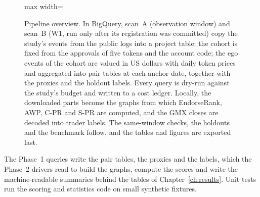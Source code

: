 \begin{figure}[htbp]
\begin{adjustbox}{max width=\linewidth}
\end{adjustbox}
\caption[{Pipeline overview: the study's events are copied and aggregated in BigQuery, the cohort is fixed, the pair tables are downloaded, and the scores, checks, holdouts and benchmark are computed locally.}]{Pipeline overview. In BigQuery, scan~A (observation window) and scan~B (W1, run only after its registration was committed) copy the study's events from the public logs into a project table; the cohort is fixed from the approvals of five tokens and the account code; the ego events of the cohort are valued in US dollars with daily token prices and aggregated into pair tables at each anchor date, together with the proxies and the holdout labels. Every query is dry-run against the study's budget and written to a cost ledger. Locally, the downloaded parts become the graphs from which EndorseRank, AWP, C-PR and S-PR are computed, and the GMX closes are decoded into trader labels. The same-window checks, the holdouts and the benchmark follow, and the tables and figures are exported last.}
\label{fig:pipeline-architecture}
\end{figure}

The Phase~1 queries write the pair tables, the proxies and the labels, which the Phase~2 drivers read to build the graphs, compute the scores and write the machine-readable summaries behind the tables of Chapter~\ref{ch:results}. Unit tests run the scoring and statistics code on small synthetic fixtures.


